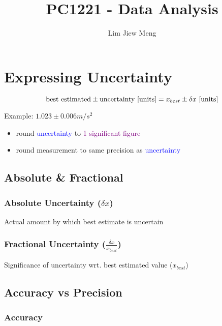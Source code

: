 \documentclass[12pt]{article}
\begin{document}
\title{PC1221 - Data Analysis}
\author{Lim Jiew Meng}
\maketitle

\section{Expressing Uncertainty}

\begin{mdframed}
$$
\textrm{best estimated} \pm \textrm{uncertainty} \textrm{ [units]} \\ = x_{best} \pm \delta x \textrm{ [units]}
$$
\end{mdframed}
\vspace{0.5cm}

Example: $1.023 \pm 0.006 m/s^2$

\begin{itemize}
	\item round \textcolor{blue}{uncertainty} to \textcolor{purple}{1 significant figure}
	\item round \textcolor{Mulberry}{measurement} to same precision as \textcolor{blue}{uncertainty}
\end{itemize}

\subsection{Absolute \& Fractional}

\subsubsection{Absolute Uncertainty ($\delta x$)}

Actual amount by which best estimate is uncertain

\subsubsection{Fractional Uncertainty (\large{$\frac{\delta x}{x_{best}}$})}

Significance of uncertainty wrt. best estimated value ($x_{best}$)

\subsection{Accuracy vs Precision}

\subsubsection{Accuracy}
\end{document}
